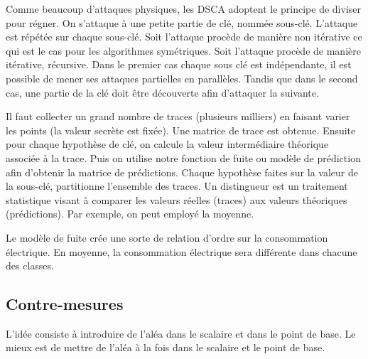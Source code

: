 Comme beaucoup d'attaques physiques, les DSCA adoptent le principe de diviser pour régner. On s'attaque à une petite partie de clé, nommée sous-clé. L'attaque est répétée sur chaque sous-clé. Soit l'attaque procède de manière non itérative ce qui est le cas pour les algorithmes symétriques. Soit l'attaque procède de manière itérative, récursive. Dans le premier cas chaque sous clé est indépendante, il est possible de mener ses attaques partielles en parallèles. Tandis que dans le second cas, une partie de la clé doit être découverte afin d'attaquer la suivante.

Il faut collecter un grand nombre de traces (plusieurs milliers) en faisant varier les points (la valeur secrète est fixée). Une matrice de trace est obtenue. Ensuite pour chaque hypothèse de clé, on calcule la valeur intermédiaire théorique associée à la trace. Puis on utilise notre fonction de fuite ou modèle de prédiction afin d'obtenir la matrice de prédictions. Chaque hypothèse faites sur la valeur de la sous-clé, partitionne l'ensemble des traces. Un distingueur est un traitement statistique visant à comparer les valeurs réelles (traces) aux valeurs théoriques (prédictions). Par exemple, on peut employé la moyenne.

Le modèle de fuite crée une sorte de relation d'ordre sur la consommation électrique. En moyenne, la consommation électrique sera différente dans chacune des classes.

\subsection{Contre-mesures}
L'idée consiste à introduire de l'aléa dans le scalaire et dans le point de base. Le mieux est de mettre de l'aléa à la fois dans le scalaire et le point de base.

